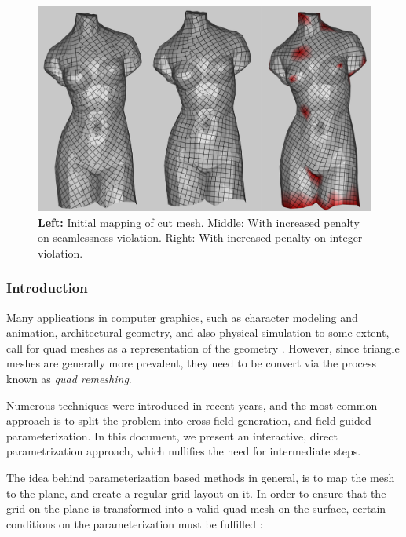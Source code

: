 % 
% 
%
\begin{figure}[ht]
\centering
\includegraphics[width=15cm]{figures/teaser.png}
\caption[Abstract's Teaser]{\textbf{Left:} Initial mapping of cut mesh. {Middle:} With increased penalty on seamlessness violation. {Right:} With increased penalty on integer violation.}
\label{fig:teaser}
\end{figure}

\subsubsection{Introduction}
Many applications in computer graphics, such as character modeling and animation, architectural geometry, and also physical simulation to some extent, call for quad meshes as a representation of the geometry \cite{10.1111/cgf.12014}. However, since triangle meshes are generally more prevalent, they need to be convert via the process known as \emph{quad remeshing}.

\noindent Numerous techniques were introduced in recent years, and the most common approach is to split the problem into cross field generation, and field guided parameterization. In this document, we present an interactive, direct parametrization approach, which nullifies the need for intermediate steps.

\noindent The idea behind parameterization based methods in general, is to map the mesh to the plane, and create a regular grid layout on it. In order to ensure that the grid on the plane is transformed into a valid quad mesh on the surface, certain conditions on the parameterization must be fulfilled \cite{bommes:hal-00862648}:

